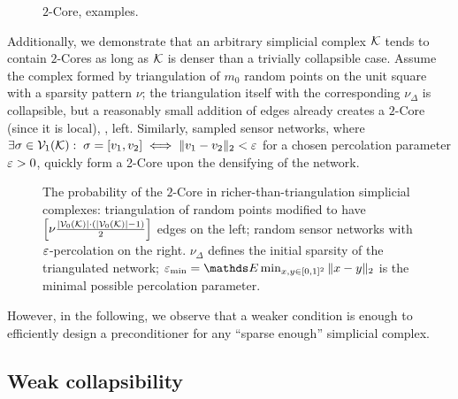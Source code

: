 \begin{figure}[htbp]
      \centering
      
      \caption{ \(2\)-Core, examples. \label{fig:2-core} }
\end{figure}

Additionally, we demonstrate that an arbitrary simplicial complex \(\mathcal{K}\) tends to contain \(2\)-Cores as long as \( \mathcal{K} \) is denser than a trivially collapsible case. Assume the complex formed by triangulation of \( m_0 \) random points on the unit square with a sparsity pattern \( \nu \); the triangulation itself with the corresponding \( \nu_\Delta \) is collapsible, but a reasonably small addition of edges already creates a \(2\)-Core (since it is local), , left. Similarly, sampled sensor networks, where \( \exists \sigma \in \mathcal{V}_{1}(\mathcal{K}): \; \sigma = [v_1, v_2] \iff \| v_1 - v_2 \|_2 < \varepsilon \) for a chosen percolation parameter \( \varepsilon > 0 \), quickly form a 2-Core upon the densifying of the network.

\begin{figure}[htbp]
      \centering
      \scalebox{0.4}{
            
      }%
      \scalebox{0.4}{
            
      }
      \caption{ The probability of the \( 2 \)-Core in richer-than-triangulation simplicial complexes: triangulation of random points modified to have \( \left[ \nu \frac{ | \mathcal{V}_{0}(\mathcal{K}) | \cdot ( | \mathcal{V}_{0}(\mathcal{K}) | - 1 ) }{2} \right] \) edges on the left; random sensor networks with \( \varepsilon \)-percolation on the right. \( \nu_\Delta \) defines the initial sparsity of the triangulated network; \(\eps_{\min} = \ds E \min_{x, y \in [0, 1]^2} \| x - y\|_2 \) is the minimal possible percolation parameter. \label{fig:core_prob} }
\end{figure}

However, in the following, we observe that a weaker condition is enough to efficiently design a preconditioner for any ``sparse enough'' simplicial complex.

\subsection{Weak collapsibility}


